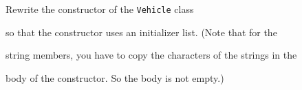 Rewrite the constructor of the \texttt{Vehicle} class

so that the constructor uses an initializer list. (Note that for the

string members, you have to copy the characters of the strings in the

body of the constructor. So the body is not empty.)

